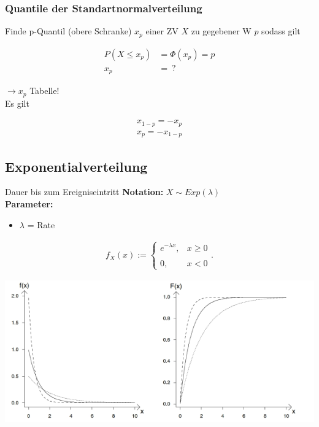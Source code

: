 \documentclass[10pt,a4paper]{article}
\begin{document}
\subsubsection{Quantile der Standartnormalverteilung}
Finde p-Quantil (obere Schranke) $x_p$ einer ZV $X$ zu gegebener W $p$ sodass gilt
  \begin{mdframed}[style=exercise]
    \begin{align}
        P(X\leq x_p) &= \Phi(x_p) = p \\
        x_p &= \ ?
    \end{align}
  \end{mdframed}
  $\rightarrow x_p$ Tabelle! \\
  Es gilt
  \begin{mdframed}[style=exercise]
    \begin{align}
        x_{1-p} = -x_p\\
        x_{p} = -x_{1-p}
    \end{align}
  \end{mdframed}

\subsection{Exponentialverteilung}
Dauer bis zum Ereigniseintritt
\textbf{Notation:} $X \sim Exp(\lambda)$ \\
\textbf{Parameter:} \begin{itemize}
    \item $\lambda$ = Rate
\end{itemize}
  \begin{mdframed}[style=exercise]
    \begin{align}
        f_X(x):=\left\{\begin{array}{ll} e^{-\lambda x}, & x \geq 0 \\ \\
        0, & x < 0 \end{array}\right. .
    \end{align}
  \end{mdframed}

  \begin{center}
      \includegraphics[width=.5\textwidth]{./img/expo.png}
  \end{center}
\end{document}
